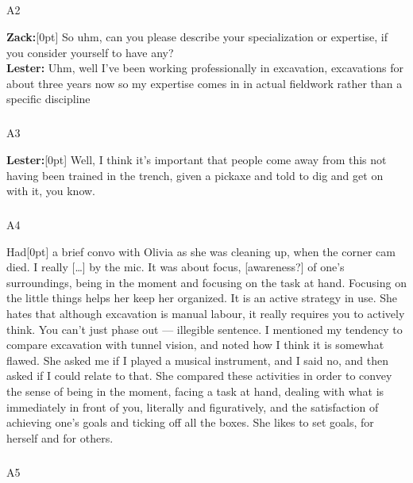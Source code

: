 \documentclass[
]{article}
\makeatletter
\let\oldsubparagraph\subparagraph
\renewcommand{\subparagraph}{
    \@ifstar
      \xxxSubParagraphStar
      \xxxSubParagraphNoStar
  }
\newcommand{\xxxSubParagraphStar}[1]{\oldsubparagraph*{#1}\mbox{}}
\newcommand{\xxxSubParagraphNoStar}[1]{\oldsubparagraph{#1}\mbox{}}
\newcommand{\paragraphnumber}[1]{\marginnote{\color{lightgray}\tiny{#1}}[0pt]}
\makeatother
\begin{document}
\subparagraph{A2}\label{sec-A2}

\textbf{Zack:}\paragraphnumber{[96]} So uhm, can you please describe
your specialization or expertise, if you consider yourself to have
any?\\
\textbf{Lester:} Uhm, well I've been working professionally in
excavation, excavations for about three years now so my expertise comes
in in actual fieldwork rather than a specific discipline

\subparagraph{A3}\label{sec-A3}

\textbf{Lester:}\paragraphnumber{[97]} Well, I think it's important that
people come away from this not having been trained in the trench, given
a pickaxe and told to dig and get on with it, you know.

\subparagraph{A4}\label{sec-A4}

Had\paragraphnumber{[98]} a brief convo with Olivia as she was cleaning
up, when the corner cam died. I really {[}\ldots{]} by the mic. It was
about focus, {[}awareness?{]} of one's surroundings, being in the moment
and focusing on the task at hand. Focusing on the little things helps
her keep her organized. It is an active strategy in use. She hates that
although excavation is manual labour, it really requires you to actively
think. You can't just phase out --- illegible sentence. I mentioned my
tendency to compare excavation with tunnel vision, and noted how I think
it is somewhat flawed. She asked me if I played a musical instrument,
and I said no, and then asked if I could relate to that. She compared
these activities in order to convey the sense of being in the moment,
facing a task at hand, dealing with what is immediately in front of you,
literally and figuratively, and the satisfaction of achieving one's
goals and ticking off all the boxes. She likes to set goals, for herself
and for others.

\subparagraph{A5}\label{sec-A5}
\end{document}
